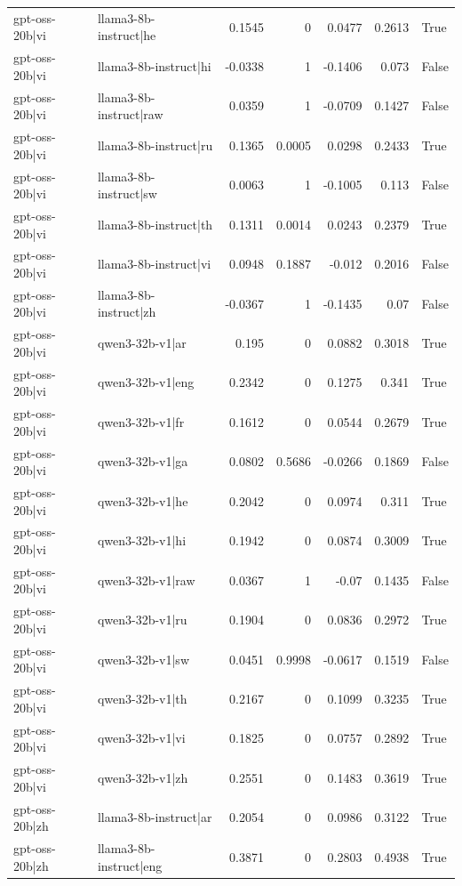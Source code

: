 \begin{table}
\begin{tabular}{l l r r r r l}
gpt-oss-20b|vi & llama3-8b-instruct|he & 0.1545 & 0 & 0.0477 & 0.2613 & True \\
gpt-oss-20b|vi & llama3-8b-instruct|hi & -0.0338 & 1 & -0.1406 & 0.073 & False \\
gpt-oss-20b|vi & llama3-8b-instruct|raw & 0.0359 & 1 & -0.0709 & 0.1427 & False \\
gpt-oss-20b|vi & llama3-8b-instruct|ru & 0.1365 & 0.0005 & 0.0298 & 0.2433 & True \\
gpt-oss-20b|vi & llama3-8b-instruct|sw & 0.0063 & 1 & -0.1005 & 0.113 & False \\
gpt-oss-20b|vi & llama3-8b-instruct|th & 0.1311 & 0.0014 & 0.0243 & 0.2379 & True \\
gpt-oss-20b|vi & llama3-8b-instruct|vi & 0.0948 & 0.1887 & -0.012 & 0.2016 & False \\
gpt-oss-20b|vi & llama3-8b-instruct|zh & -0.0367 & 1 & -0.1435 & 0.07 & False \\
gpt-oss-20b|vi & qwen3-32b-v1|ar & 0.195 & 0 & 0.0882 & 0.3018 & True \\
gpt-oss-20b|vi & qwen3-32b-v1|eng & 0.2342 & 0 & 0.1275 & 0.341 & True \\
gpt-oss-20b|vi & qwen3-32b-v1|fr & 0.1612 & 0 & 0.0544 & 0.2679 & True \\
gpt-oss-20b|vi & qwen3-32b-v1|ga & 0.0802 & 0.5686 & -0.0266 & 0.1869 & False \\
gpt-oss-20b|vi & qwen3-32b-v1|he & 0.2042 & 0 & 0.0974 & 0.311 & True \\
gpt-oss-20b|vi & qwen3-32b-v1|hi & 0.1942 & 0 & 0.0874 & 0.3009 & True \\
gpt-oss-20b|vi & qwen3-32b-v1|raw & 0.0367 & 1 & -0.07 & 0.1435 & False \\
gpt-oss-20b|vi & qwen3-32b-v1|ru & 0.1904 & 0 & 0.0836 & 0.2972 & True \\
gpt-oss-20b|vi & qwen3-32b-v1|sw & 0.0451 & 0.9998 & -0.0617 & 0.1519 & False \\
gpt-oss-20b|vi & qwen3-32b-v1|th & 0.2167 & 0 & 0.1099 & 0.3235 & True \\
gpt-oss-20b|vi & qwen3-32b-v1|vi & 0.1825 & 0 & 0.0757 & 0.2892 & True \\
gpt-oss-20b|vi & qwen3-32b-v1|zh & 0.2551 & 0 & 0.1483 & 0.3619 & True \\
gpt-oss-20b|zh & llama3-8b-instruct|ar & 0.2054 & 0 & 0.0986 & 0.3122 & True \\
gpt-oss-20b|zh & llama3-8b-instruct|eng & 0.3871 & 0 & 0.2803 & 0.4938 & True \\

\end{tabular}
\end{table}
